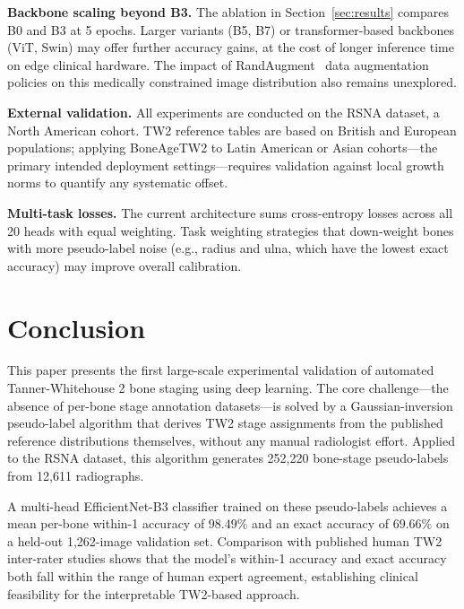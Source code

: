 \documentclass[journal]{IEEEtran}
\begin{document}
\textbf{Backbone scaling beyond B3.}
The ablation in Section~\ref{sec:results} compares B0 and B3 at
5 epochs.
Larger variants (B5, B7) or transformer-based backbones (ViT, Swin)
may offer further accuracy gains, at the cost of longer inference
time on edge clinical hardware.
The impact of RandAugment~\cite{cubuk2020} data augmentation policies
on this medically constrained image distribution also remains
unexplored.

\textbf{External validation.}
All experiments are conducted on the RSNA dataset, a North American
cohort.
TW2 reference tables are based on British and European populations;
applying BoneAgeTW2 to Latin American or Asian cohorts—the primary
intended deployment settings—requires validation against local
growth norms to quantify any systematic offset.

\textbf{Multi-task losses.}
The current architecture sums cross-entropy losses across all
20 heads with equal weighting.
Task weighting strategies that down-weight bones with more pseudo-label
noise (e.g., radius and ulna, which have the lowest exact accuracy)
may improve overall calibration.

\section{Conclusion}
\label{sec:conclusion}

This paper presents the first large-scale experimental validation
of automated Tanner-Whitehouse 2 bone staging using deep learning.
The core challenge—the absence of per-bone stage annotation
datasets—is solved by a Gaussian-inversion pseudo-label algorithm
that derives TW2 stage assignments from the published reference
distributions themselves, without any manual radiologist effort.
Applied to the RSNA dataset, this algorithm generates 252,220
bone-stage pseudo-labels from 12,611 radiographs.

A multi-head EfficientNet-B3 classifier trained on these
pseudo-labels achieves a mean per-bone within-1 accuracy of
$\mathbf{98.49\%}$ and an exact accuracy of $\mathbf{69.66\%}$
on a held-out 1,262-image validation set.
Comparison with published human TW2 inter-rater studies
shows that the model's within-1 accuracy and exact accuracy
both fall within the range of human expert agreement,
establishing clinical feasibility for the
interpretable TW2-based approach.
\end{document}
